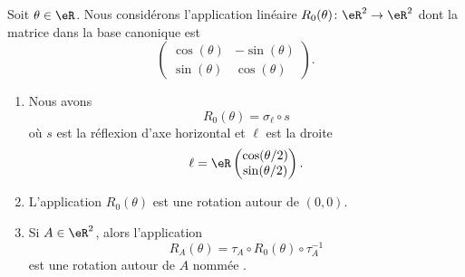 \begin{lemmaDef}        \label{DEFooADTDooKIZbrw}
    Soit \( \theta\in \eR\). Nous considérons l'application linéaire \( R_0(\theta)\colon \eR^2\to \eR^2\) dont la matrice dans la base canonique est
    \begin{equation}
        \begin{pmatrix}
            \cos(\theta)    &   -\sin(\theta)    \\ 
            \sin(\theta)    &   \cos(\theta)    
        \end{pmatrix}.
    \end{equation}
    \begin{enumerate}
        \item       \label{ITEMooIEKJooZfsAui}
    Nous avons
    \begin{equation}        \label{EQooEVCTooBpTDDq}
        R_0(\theta)=\sigma_{\ell}\circ s
    \end{equation}
    où \( s\) est la réflexion d'axe horizontal et \( \ell\) est la droite
    \begin{equation}
        \ell=\eR\begin{pmatrix}
            \cos(\theta/2)    \\ 
            \sin(\theta/2)    
        \end{pmatrix}.
    \end{equation}
\item       \label{ITEMooBEYOooMHRRYk}
    L'application \( R_0(\theta)\) est une rotation autour de \( (0,0)\).
\item     \label{ITEMooEQPAooQcsYfj}
          Si \( A\in \eR^2\), alors l'application
          \begin{equation}
              R_A(\theta)=\tau_A\circ R_0(\theta)\circ \tau_A^{-1}
          \end{equation}
            est une rotation autour de \( A\) nommée .       
    \end{enumerate}
\end{lemmaDef}

